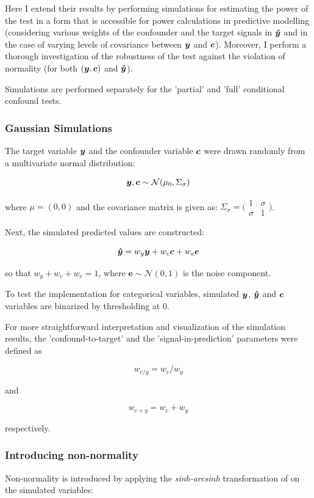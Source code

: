 \documentclass{article}
\begin{document}
Here I extend their results by performing simulations for estimating the power of the test in a form that is accessible for power calculations in predictive modelling (considering various weights of the confounder and the target signals in $\boldsymbol{\hat{y}}$ and in the case of varying levels of covariance between $\boldsymbol{y}$ and $\boldsymbol{c}$).
Moreover, I perform a thorough investigation of the robustness of the test against the violation of normality (for both $(\boldsymbol{y}, \boldsymbol{c})$ and $\boldsymbol{\hat{y}}$).

Simulations are performed separately for the 'partial' and 'full' conditional confound tests.

\subsubsection*{Gaussian Simulations}
The target variable $\boldsymbol{y}$ and the confounder variable $\boldsymbol{c}$ were drawn randomly from a multivariate normal distribution:

$$ \boldsymbol{y}, \boldsymbol{c} \sim \mathcal{N}(\mu_0, \Sigma_\sigma) $$

where $\mu=(0, 0)$ and the covariance matrix is given as:
$\Sigma_\sigma = \big(\begin{smallmatrix}
  1 & \sigma\\
  \sigma & 1
\end{smallmatrix}\big)$.

Next, the simulated predicted values are constructed:

$$ \boldsymbol{\hat{y}} = w_y \boldsymbol{y} + w_c \boldsymbol{c} + w_e \boldsymbol{e}$$

so that $w_y + w_c + w_e = 1$, where $\boldsymbol{e} \sim \mathcal{N}(0,1)$ is the noise component.

To test the implementation for categorical variables, simulated $\boldsymbol{y}$, $\boldsymbol{\hat{y}}$ and $\boldsymbol{c}$ variables are binarized by thresholding at 0.

For more straightforward interpretation and visualization of the simulation results, the 'confound-to-target' and the 'signal-in-prediction' parameters were defined as

$$ w_{c/y} = w_c / w_y $$

and

$$ w_{c+y} = w_c + w_y $$

respectively.

\subsubsection*{Introducing non-normality}

Non-normality is introduced by applying the \emph{sinh-arcsinh} transformation of \cite{jones2009sinh} on the simulated variables:
\end{document}
